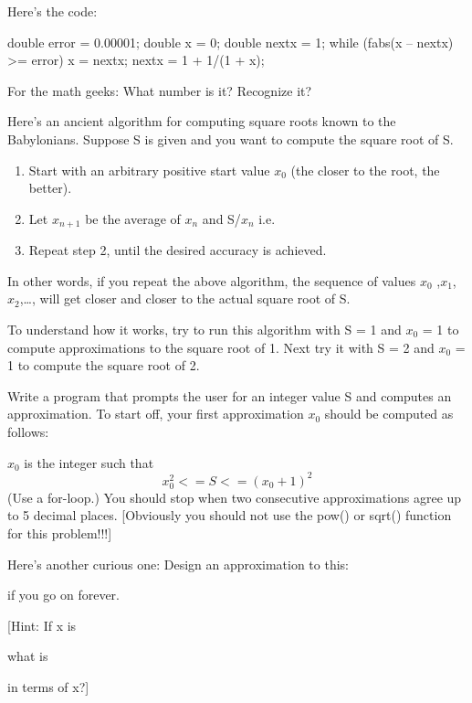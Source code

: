 Here's the code:
\begin{console}
double error = 0.00001;
double x = 0;
double nextx = 1;
while (fabs(x -- nextx) >= error)
{     
      x = nextx;
      nextx = 1 + 1/(1 + x);
}
\end{console}

For the math geeks: What number is it? Recognize it?

\begin{ex} Here's an ancient algorithm for computing
square roots known to the Babylonians. Suppose S is given and you want
to compute the square root of S.

\begin{enumerate}
\item
  Start with an arbitrary positive start value $x_0$
  (the closer to the root, the better).
\item
  Let $x_{n+1}$ be the average of
  $x_n$ and S/$x_n$ i.e.
\item
  Repeat step 2, until the desired accuracy is achieved.
\end{enumerate}
\end{ex}
In other words, if you repeat the above algorithm, the sequence of
values $x_0$ ,$x_1$, $x_2$,\ldots, will get closer and closer to the actual square root of S.

To understand how it works, try to run this algorithm with S = 1 and
$x_0$ = 1 to compute approximations to the square root of 1. Next try it with S = 2 and $x_0$ = 1 to compute the square root of 2.

Write a program that prompts the user for an integer value S and computes an approximation. To start off, your first approximation $x_0$ should be computed as follows:

$x_0$ is the integer such that
\[x_0^2 <= S <= (x_0 + 1)^2\]
(Use a for-loop.) You should stop when two consecutive approximations
agree up to 5 decimal places. [Obviously you should not use the pow()
or sqrt() function for this problem!!!]

\begin{ex} Here's another curious one: Design an
approximation to this:


if you go on forever.

[Hint: If x is


what is


in terms of x?]
\end{ex}
\newpage{}

